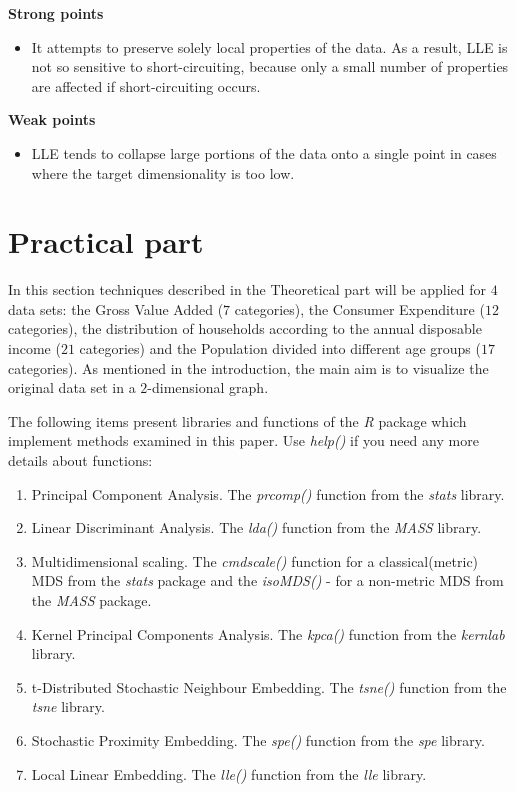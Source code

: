 \documentclass[a4paper]{article}
\begin{document}
\textbf{Strong points}
\begin{itemize}
  \item It attempts to preserve solely local properties of the data. As a result, LLE is not so sensitive to short-circuiting,
because only a small number of properties are affected if short-circuiting occurs.
\end{itemize}

\textbf{Weak points}
\begin{itemize}
  \item LLE tends to collapse large portions of the data onto a single point in cases where the target dimensionality is
too low.
\end{itemize}

\section{Practical part}
In this section techniques described in the Theoretical part will be
applied for $4$ data sets: the Gross Value Added ($7$ categories), the Consumer Expenditure ($12$ categories), the distribution of
households according to the annual disposable income ($21$ categories)
and the Population divided into different age groups ($17$ categories). As mentioned in the introduction, the main
aim is to visualize the original data set in a $2$-dimensional graph.

The following items present libraries and functions of the \textit{R} package which
implement methods examined in this paper. Use \textit{help()} if you
need any more details about functions:
\begin{enumerate}
  \item Principal Component Analysis. The \textit{prcomp()} function
    from the \textit{stats} library.
  \item Linear Discriminant Analysis. The \textit{lda()} function
    from the \textit{MASS} library.
  \item Multidimensional scaling. The
\textit{cmdscale()} function for a classical(metric) MDS from
the \textit{stats} package and the \textit{isoMDS()} - for
a non-metric MDS from the \textit{MASS} package.
  \item Kernel Principal Components Analysis. The \textit{kpca()} function
    from the \textit{kernlab} library.
  \item t-Distributed Stochastic Neighbour Embedding. The
    \textit{tsne()} function from the \textit{tsne} library.
  \item Stochastic Proximity Embedding. The \textit{spe()} function
    from the \textit{spe} library.
  \item Local Linear Embedding. The \textit{lle()} function
    from the \textit{lle} library.
\end{enumerate}
\end{document}
